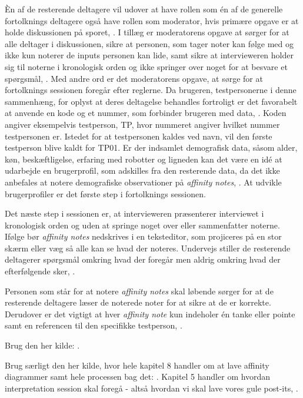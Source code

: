 Èn af de resterende deltagere vil udover at have rollen som én af de generelle fortolknings deltagere også have rollen som moderator, hvis primære opgave er at holde diskussionen på sporet, \parencite[s. 108]{Book:CIInterpretationSession}. I tillæg er moderatorens opgave at sørger for at alle deltager i diskussionen, sikre at personen, som tager noter kan følge med og ikke kun noterer de inputs personen kan lide, samt sikre at intervieweren holder sig til noterne i kronologisk orden og ikke springer over noget for at besvare et spørgsmål, \parencite[ss. 108-109]{Book:CIInterpretationSession}. Med andre ord er det moderatorens opgave, at sørge for at fortolknings sessionen foregår efter reglerne. \blankline
%   
Da brugeren, testpersonerne i denne sammenhæng, for oplyst at deres deltagelse behandles fortroligt er det favorabelt at anvende en kode og et nummer, som forbinder brugeren med data, \parencite[s. 111]{Book:CIInterpretationSession}. Koden angiver eksempelvis testperson, TP, hvor nummeret angiver hvilket nummer testpersonen er. Istedet for at testpersonen kaldes ved navn, vil den første testperson blive kaldt for TP01. Er der indsamlet demografisk data, såsom alder, køn, beskæftligelse, erfaring med robotter og ligneden kan det være en idé at udarbejde en brugerprofil, som adskilles fra den resterende data, da det ikke anbefales at notere demografiske observationer på \textit{affinity notes}, \parencite[s. 109]{Book:CIInterpretationSession}. At udvikle brugerprofiler er det første step i fortolknings sessionen. 

Det næste step i sessionen er, at intervieweren præsenterer interviewet i kronologisk orden og uden at springe noget over eller sammenfatter noterne. Ifølge \textcite[s. 113]{Book:CIInterpretationSession} bør \textit{affinity notes} nedskrives i en teksteditor, som projiceres på en stor skærm eller væg så alle kan se hvad der noteres. Undervejs stiller de resterende deltagerer spørgsmål omkring hvad der foregår men aldrig omkring hvad der efterfølgende sker, \parencite[s. 114]{Book:CIInterpretationSession}.

Personen som står for at notere \textit{affinity notes} skal løbende sørger for at de resterende deltagere læser de noterede noter for at sikre at de er korrekte. Derudover er det vigtigt at hver \textit{affinity note} kun indeholer én tanke eller pointe samt en referencen til den specifikke testperson, \parencite[s. 115]{Book:CIInterpretationSession}. 

    






  


Brug den her kilde: \textcite[ss. 24-28]{PDF:ConsolidationIdeationAffinity}. 

Brug særligt den her kilde, hvor hele kapitel 8 handler om at lave affinity diagrammer samt hele processen bag det: \textcite[ss. 159-179]{Book:BuildingAnAffinity}. Kapitel 5 handler om hvordan interpretation session skal foregå - altså hvordan vi skal lave vores gule post-its, \textcite[ss. 101-122]{Book:CIInterpretationSession}.

